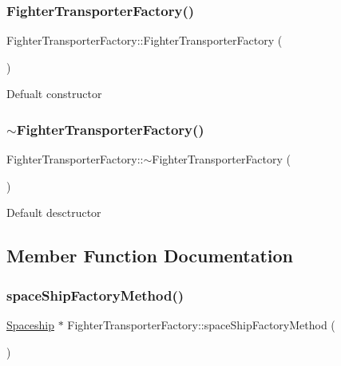 \subsubsection{\texorpdfstring{Fighter\+Transporter\+Factory()}{FighterTransporterFactory()}}
{\footnotesize\ttfamily Fighter\+Transporter\+Factory\+::\+Fighter\+Transporter\+Factory (\begin{DoxyParamCaption}{ }\end{DoxyParamCaption})}

Defualt constructor \mbox{\label{classFighterTransporterFactory_a1ed7e181f7c2ecbfc7b7e69c1085637f}} 
\subsubsection{\texorpdfstring{$\sim$\+Fighter\+Transporter\+Factory()}{~FighterTransporterFactory()}}
{\footnotesize\ttfamily Fighter\+Transporter\+Factory\+::$\sim$\+Fighter\+Transporter\+Factory (\begin{DoxyParamCaption}{ }\end{DoxyParamCaption})}

Default desctructor 

\subsection{Member Function Documentation}
\mbox{\label{classFighterTransporterFactory_a599f35f61d2ccd5d6eb44d97540660f9}} 
\subsubsection{\texorpdfstring{space\+Ship\+Factory\+Method()}{spaceShipFactoryMethod()}}
{\footnotesize\ttfamily \hyperlink{classSpaceship}{Spaceship} $\ast$ Fighter\+Transporter\+Factory\+::space\+Ship\+Factory\+Method (\begin{DoxyParamCaption}{ }\end{DoxyParamCaption})\hspace{0.3cm}{\ttfamily [virtual]}}

